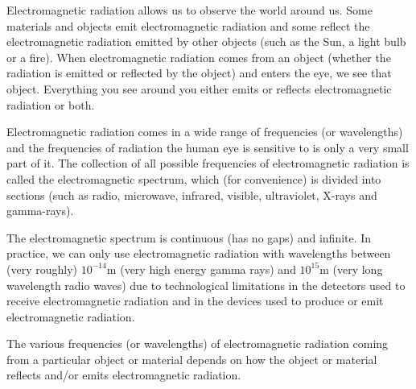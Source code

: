       \label{m38778*id187230}Electromagnetic radiation allows us to observe the world around us. Some materials and objects emit electromagnetic radiation and some reflect the electromagnetic radiation emitted by other objects (such as the Sun, a light bulb or a fire). When electromagnetic radiation comes from an object (whether the radiation is emitted or reflected by the object) and enters the eye, we see that object. Everything you see around you either emits or reflects electromagnetic radiation or both.\par 
      \label{m38778*eip-532}Electromagnetic radiation comes in a wide range of frequencies (or wavelengths) and the frequencies of radiation the human eye is sensitive to is only a very small part of it. The collection of all possible frequencies of electromagnetic radiation is called the electromagnetic spectrum, which (for convenience) is divided into sections (such as radio, microwave, infrared, visible, ultraviolet, X-rays and gamma-rays).\par \label{m38778*eip-855}The electromagnetic spectrum is continuous (has no gaps) and infinite. In practice, we can only use electromagnetic radiation with wavelengths between (very roughly) ${10}^{-14}\mathrm{m}$ (very high energy gamma rays) and ${10}^{15}\mathrm{m}$ (very long wavelength radio waves) due to technological limitations in the detectors used to receive electromagnetic radiation and in the devices used to produce or emit electromagnetic radiation.\par \label{m38778*id187253}The various frequencies (or wavelengths) of electromagnetic radiation coming from a particular object or material depends on how the object or material reflects and/or emits electromagnetic radiation.\par 
\label{m38778*secfhsst!!!underscore!!!id117}
